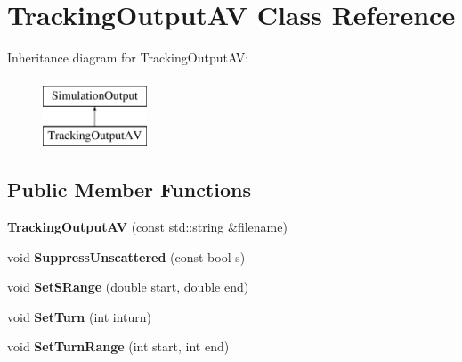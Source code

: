 \hypertarget{classTrackingOutputAV}{}\section{Tracking\+Output\+AV Class Reference}
\label{classTrackingOutputAV}
Inheritance diagram for Tracking\+Output\+AV\+:\begin{figure}[H]
\begin{center}
\leavevmode
\includegraphics[height=2.000000cm]{classTrackingOutputAV}
\end{center}
\end{figure}
\subsection*{Public Member Functions}
\begin{DoxyCompactItemize}
\item 
\mbox{\label{classTrackingOutputAV_a4d3c25b8080259c3c415b2f7598c53e7}} 
{\bfseries Tracking\+Output\+AV} (const std\+::string \&filename)
\item 
\mbox{\label{classTrackingOutputAV_a0ced1982aef27b4af1a2222275c89387}} 
void {\bfseries Suppress\+Unscattered} (const bool s)
\item 
\mbox{\label{classTrackingOutputAV_a02f680c7a666a3b86403c974fe850e09}} 
void {\bfseries Set\+S\+Range} (double start, double end)
\item 
\mbox{\label{classTrackingOutputAV_a81e0d6962f2af6ed74a49aba7bff73df}} 
void {\bfseries Set\+Turn} (int inturn)
\item 
\mbox{\label{classTrackingOutputAV_a7ed73fb9c72e2d3af33b87207dfd909e}} 
void {\bfseries Set\+Turn\+Range} (int start, int end)
\end{DoxyCompactItemize}
